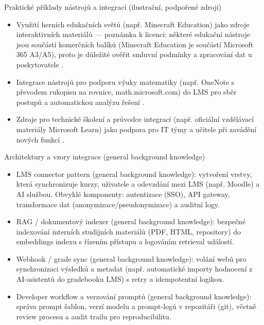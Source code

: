\documentclass{report}%
\begin{document}
Praktické příklady nástrojů a integrací (ilustrační, podpořené zdroji)
\begin{itemize}
  \item Využití herních edukačních světů (např. Minecraft Education) jako zdroje interaktivních materiálů — poznámka k licenci: některé edukační nástroje jsou součástí komerčních balíků (Minecraft Education je součástí Microsoft 365 A3/A5), proto je důležité ověřit smluvní podmínky a zpracování dat u poskytovatele \cite{kb_ai_101_tipu_pdf_04e4a115_page_15_2}.
  \item Integrace nástrojů pro podporu výuky matematiky (např. OneNote s převodem rukopisu na rovnice, math.microsoft.com) do LMS pro sběr postupů a automatickou analýzu řešení \cite{kb_ai_101_tipu_pdf_04e4a115_page_8_1}.
  \item Zdroje pro technické školení a průvodce integrací (např. oficiální vzdělávací materiály Microsoft Learn) jako podpora pro IT týmy a učitele při zavádění nových funkcí \cite{kb_ai_101_tipu_pdf_04e4a115_page_54_1}.
\end{itemize}

Architektury a vzory integrace (general background knowledge)
\begin{itemize}
  \item LMS connector pattern (general background knowledge): vytvoření vrstvy, která synchronizuje kurzy, uživatele a odevzdání mezi LMS (např. Moodle) a AI službou. Obvyklé komponenty: autentizace (SSO), API gateway, transformace dat (anonymizace/pseudonymizace) a auditní logy.
  \item RAG / dokumentový indexer (general background knowledge): bezpečné indexování interních studijních materiálů (PDF, HTML, repository) do embeddings indexu s řízením přístupu a logováním retrieval událostí.
  \item Webhook / grade sync (general background knowledge): volání webů pro synchronizaci výsledků a metadat (např. automatické importy hodnocení z AI‑asistentů do gradebooku LMS) s retry a idempotentní logikou.
  \item Developer workflow a verzování promptů (general background knowledge): správa prompt šablon, verzí modelu a prompt‑logů v repozitáři (git), včetně review procesu a audit trailu pro reproducibilitu.
\end{itemize}
\end{document}

